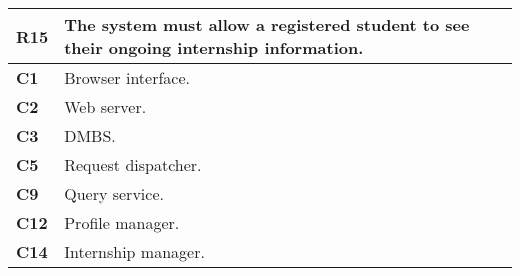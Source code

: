 \begin{table}[H]
    \centering
    \begin{tabular}{|l|m{10cm}|}
        \hline \textbf{R15} & The system must allow a registered student to see their ongoing internship information.\\
        \hline \textbf{C1} & Browser interface. \\
        \hline \textbf{C2} & Web server. \\
        \hline \textbf{C3} & DMBS. \\
        \hline \textbf{C5} & Request dispatcher. \\
        \hline \textbf{C9} & Query service. \\
        \hline \textbf{C12} & Profile manager.\\
        \hline \textbf{C14} & Internship manager. \\
        \hline
    \end{tabular}
\end{table}


